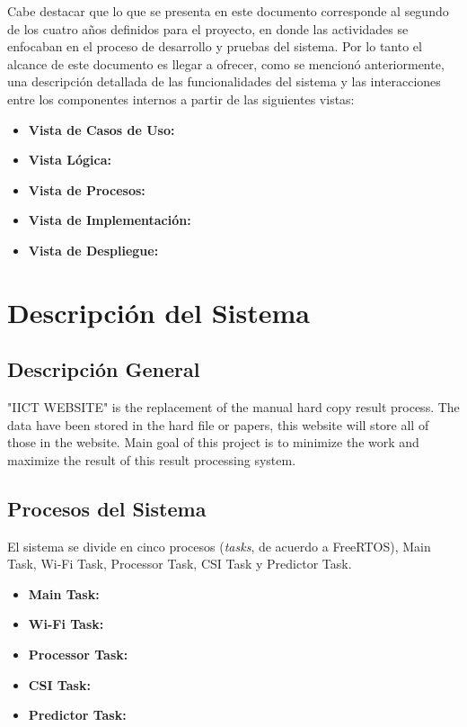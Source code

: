 \documentclass{scrreprt}
\begin{document}
Cabe destacar que lo que se presenta en este documento corresponde al segundo de los cuatro años definidos para el proyecto, en donde las actividades se enfocaban en el proceso de desarrollo y pruebas del sistema. Por lo tanto el alcance de este documento es llegar a ofrecer, como se mencionó anteriormente, una descripción detallada de las funcionalidades del sistema y las interacciones entre los componentes internos a partir de las siguientes vistas: 
\begin{itemize}
    \item \textbf{Vista de Casos de Uso:}
    \item \textbf{Vista Lógica: }
    \item \textbf{Vista de Procesos: }
    \item \textbf{Vista de Implementación: }
    \item \textbf{Vista de Despliegue: }
\end{itemize}

\chapter{Descripción del Sistema}

\section{Descripción General}
"IICT WEBSITE" is the replacement of the manual hard copy result process. The data have been stored in the hard file or papers, this website will store all of those in the website. Main goal of this project is to minimize the work and maximize the result of this result processing system.

\section{Procesos del Sistema }
El sistema se divide en cinco procesos (\emph{tasks}, de acuerdo a FreeRTOS), Main Task, Wi-Fi Task, Processor Task, CSI Task y Predictor Task. 
\begin{itemize}
  \item \textbf{Main Task: }
  \item \textbf{Wi-Fi Task: }
  \item \textbf{Processor Task: }
  \item \textbf{CSI Task: }
  \item \textbf{Predictor Task: }
\end{itemize}
\end{document}
